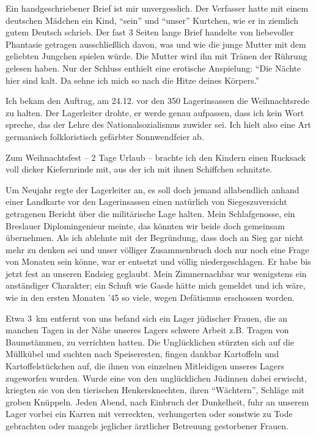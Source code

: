  Ein handgeschriebener Brief ist mir unvergesslich. Der Verfasser hatte mit einem deutschen Mädchen ein Kind, \enquote{sein} und \enquote{unser} Kurtchen, wie er in ziemlich gutem Deutsch schrieb. Der fast 3 Seiten lange Brief handelte von liebevoller Phantasie getragen ausschließlich davon, was und wie die junge Mutter mit dem geliebten Jungchen spielen würde. Die Mutter wird ihn mit Tränen der Rührung gelesen haben. Nur der Schluss enthielt eine erotische Anspielung: \enquote{Die Nächte hier sind kalt. Da sehne ich mich so nach die Hitze deines Körpers.}

Ich bekam den Auftrag, am 24.12. vor den 350 Lagerinsassen die Weihnachtsrede zu halten. Der Lagerleiter drohte, er werde genau aufpassen, dass ich kein Wort spreche, das der Lehre des Nationalsozialismus zuwider sei. Ich hielt also eine Art germanisch folkloristisch gefärbter Sonnwendfeier ab.

Zum Weihnachtsfest -- 2 Tage Urlaub -- brachte ich den Kindern einen Rucksack voll dicker Kiefernrinde mit, aus der ich mit ihnen Schiffchen schnitzte.

Um Neujahr regte der Lagerleiter an, es soll doch jemand allabendlich anhand einer Landkarte vor den Lagerinsassen einen natürlich von Siegeszuversicht getragenen Bericht über die militärische Lage halten. Mein Schlafgenosse, ein Breslauer Diplomingenieur meinte, das könnten wir beide doch gemeinsam übernehmen. Als ich ablehnte mit der Begründung, dass doch an Sieg gar nicht mehr zu denken sei und unser völliger Zusammenbruch doch nur noch eine Frage von Monaten sein könne, war er entsetzt und völlig niedergeschlagen. Er habe bis jetzt fest an unseren Endsieg geglaubt. Mein Zimmernachbar war wenigstens ein anständiger Charakter; ein Schuft wie Gasde hätte mich gemeldet und ich wäre, wie in den ersten Monaten '45 so viele, wegen Defätismus erschossen worden.

Etwa 3~km entfernt von uns befand sich ein Lager jüdischer Frauen, die an manchen Tagen in der Nähe unseres Lagers schwere Arbeit z.B. Tragen von Baumstämmen, zu verrichten hatten. Die Unglücklichen stürzten sich auf die Müllkübel und suchten nach Speiseresten, fingen dankbar Kartoffeln und Kartoffelstückchen auf, die ihnen von einzelnen Mitleidigen unseres Lagers zugeworfen wurden. Wurde eine von den  unglücklichen Jüdinnen dabei erwischt, kriegten sie von den tierischen Henkersknechten, ihren \enquote{Wächtern}, Schläge mit groben Knüppeln. Jeden Abend, nach Einbruch der Dunkelheit, fuhr an unserem Lager vorbei ein Karren mit verreckten, verhungerten oder sonstwie zu Tode gebrachten oder mangels jeglicher ärztlicher Betreuung gestorbener Frauen.

